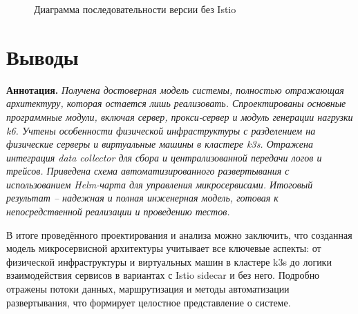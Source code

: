\begin{figure}[t]
      \centering
      \caption{Диаграмма последовательности версии без Istio}
      \label{pic:sequence-diagram-NOIstio}
    \end{figure}
  




\section{Выводы}

\textbf{Аннотация.} \textit{Получена достоверная модель системы, полностью отражающая архитектуру, которая остается лишь реализовать. Спроектированы основные программные модули, включая сервер, прокси-сервер и модуль генерации нагрузки k6. Учтены особенности физической инфраструктуры с разделением на физические серверы и виртуальные машины в кластере k3s. Отражена интеграция data collector для сбора и централизованной передачи логов и трейсов. Приведена схема автоматизированного развертывания с использованием Helm-чарта для управления микросервисами. Итоговый результат – надежная и полная инженерная модель, готовая к непосредственной реализации и проведению тестов.}

В итоге проведённого проектирования и анализа можно заключить, что созданная модель микросервисной архитектуры учитывает все ключевые аспекты: от физической инфраструктуры и виртуальных машин в кластере k3s до логики взаимодействия сервисов в вариантах с Istio sidecar и без него. Подробно отражены потоки данных, маршрутизация и методы автоматизации развертывания, что формирует целостное представление о системе.

